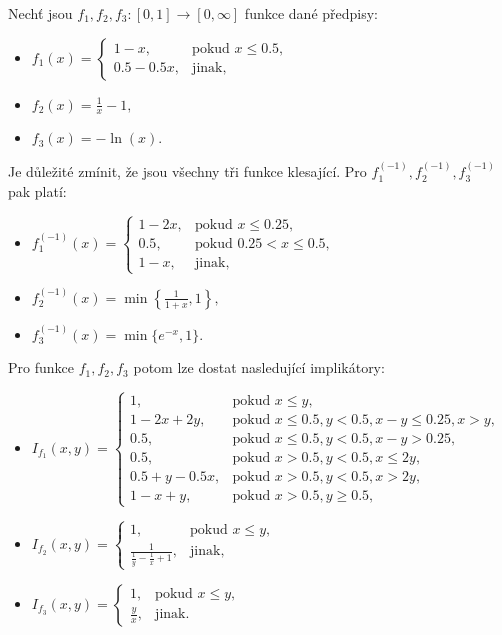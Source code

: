 \begin{example}
    Nech\v t jsou $f_1, f_2, f_3:[0,1] \rightarrow [0,
\infty]$ funkce dan\'e předpisy:
\begin{itemize}
\item $f_1(x)=\begin{cases} 1-x,  &\mbox{pokud $x \leq 0.5$},\\
0.5-0.5x,   &\text{jinak}, \end{cases}$
\item $f_2(x)= \frac{1}{x} -1,$
\item $f_3(x)= -\ln(x).$
\end{itemize}

Je d\r uležité zmínit, že jsou všechny tři funkce klesající. Pro $f_1^{(-1)}, f_2^{(-1)},
f_3^{(-1)}$ pak platí:
\begin{itemize}
\item $f_1^{(-1)}(x)=\begin{cases}  1-2x,       &\mbox{pokud $x \leq 0.25$},\\
0.5,                  &\mbox{pokud $0.25<x \leq 0.5$},\\
1-x,                  &\text{jinak,} \end{cases} $
\item $f_2^{(-1)}(x)=\min \left \{ \frac{1}{1+x},1 \right \},$
\item $f_3^{(-1)}(x)=\min \{ e^{-x},1 \}.$
\end{itemize}
Pro  funkce $f_1, f_2, f_3$ potom lze dostat nasledující implik\'atory:
\begin{itemize}
\item $I_{f_1}(x,y)=\begin{cases}  1,      &\mbox{pokud $x \leq y$}, \\
1-2x+2y,       &\mbox{pokud $x \leq 0.5, y<0.5, x-y \leq 0.25, x > y$}, \\
0.5,       &\mbox{pokud $x \leq 0.5, y<0.5, x-y>0.25$}, \\
0.5 ,      &\mbox{pokud $x>0.5, y<0.5, x \leq 2y$}, \\
0.5+y-0.5x,       &\mbox{pokud $x>0.5, y<0.5, x>2y$}, \\
1-x+y,       &\mbox{pokud $x>0.5, y \geq 0.5,$} \end{cases}$
\item $I_{f_2}(x,y)= \begin{cases} 1,      &\mbox{pokud $x \leq y$}, \\
  \frac{1}{\frac{1}{y} - \frac{1}{x} + 1},     &\text{jinak}, \end{cases} $
\item $I_{f_3}(x,y)= \begin{cases} 1,    &\mbox{pokud $x \leq y$}, \\
  \frac{y}{x},   & \mbox{jinak.} \end{cases}$
\end{itemize}
\end{example}

